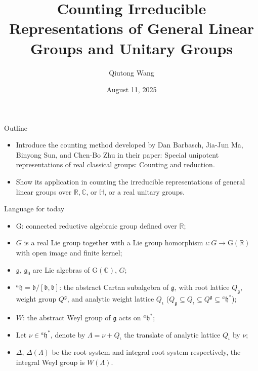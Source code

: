 \documentclass[fleqn,xcolor=dvipsnames]{beamer}
\title[]{Counting Irreducible Representations of General Linear Groups and Unitary Groups}
\author{Qiutong Wang}
\institute{Zhejiang University}
\date{August 11, 2025}
\newcommand{\BC}{{\mathbb {C}}}
\newcommand{\BH}{{\mathbb {H}}}
\newcommand{\BR}{{\mathbb {R}}}
\newcommand{\RG}{{\mathrm {G}}}
\newcommand{\fb}{\mathfrak{b}}
\newcommand{\fg}{\mathfrak{g}}
\newcommand{\fh}{\mathfrak{h}}
\begin{document}
\begin{frame}
  \titlepage
\end{frame}




\begin{frame}{Outline}

\begin{itemize}
  \item Introduce the counting method developed by Dan Barbasch, Jia-Jun Ma, Binyong Sun, and Chen-Bo Zhu in their paper: Special unipotent representations of real classical groups: Counting and reduction.
   \item Show its application in counting the irreducible representations of general linear groups over $\BR, \BC$, or $\BH$, or a real unitary groups.
\end{itemize}
\end{frame}












\begin{frame}{Language for today}
  \begin{itemize}
    \item $\RG$: connected reductive algebraic group defined over $\BR$;
    \item $G$ is a real Lie group together with a Lie group homorphism $\iota: G \to \RG(\BR)$ with open image and finite kernel;
    \item $\fg$, $\fg_0$ are Lie algebras of $\RG(\BC)$, $G$;
    \item $^{a}\fh = \fb/[\fb,\fb]$: the abstract Cartan subalgebra of $\fg$, with root lattice $Q_{\fg}$, weight group $Q^{\fg}$, and analytic weight lattice $Q_{\iota}$ ($Q_{\fg} \subseteq Q_{\iota} \subseteq Q^{\fg} \subseteq {^{a}\fh}^*$);
    \item $W$: the abstract Weyl group of $\fg$ acts on $^{a}\fh^*$;
    \item Let $\nu \in {^{a}\fh}^*$, denote by $\Lambda = \nu + Q_{\iota}$ the translate of analytic lattice $Q_{\iota}$ by $\nu$;
    \item $\Delta$, $\Delta(\Lambda)$ be the root system and integral root system respectively, the integral Weyl group is $W(\Lambda)$.
  \end{itemize}
\end{frame}
\end{document}
